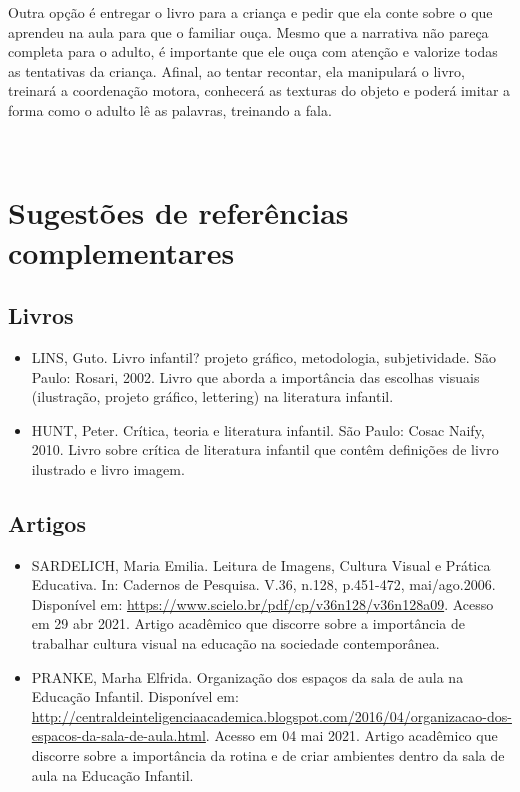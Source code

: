 \documentclass[11pt]{extarticle}
\begin{document}
\begin{enumerate}
Outra opção é entregar o livro para a criança e pedir que ela conte 
sobre o que aprendeu na aula para que o familiar ouça. Mesmo que a narrativa não pareça 
completa para o adulto, é importante que ele ouça com atenção e 
valorize todas as tentativas da criança. Afinal, ao tentar recontar, 
ela manipulará o livro, treinará a coordenação motora, conhecerá as texturas 
do objeto e poderá imitar a forma como o adulto 
lê as palavras, treinando a fala. 
\end{enumerate}

 
\section{Sugestões de referências complementares}

\subsection{Livros} 

\begin{itemize}
\item LINS, Guto. Livro infantil? projeto gráfico, metodologia, subjetividade. São Paulo: Rosari, 2002.
Livro que aborda a importância das escolhas visuais (ilustração, projeto gráfico, lettering) na literatura infantil.  

\item HUNT, Peter. Crítica, teoria e literatura infantil. São Paulo: Cosac Naify, 2010.
Livro sobre crítica de literatura infantil que contêm definições de livro ilustrado e livro imagem. 
\end{itemize}

\subsection{Artigos}

\begin{itemize}
\item SARDELICH, Maria Emilia. Leitura de Imagens, Cultura Visual e Prática Educativa. 
In: Cadernos de Pesquisa. V.36, n.128, p.451-472, mai/ago.2006. Disponível em: \url{https://www.scielo.br/pdf/cp/v36n128/v36n128a09}. 
Acesso em 29 abr 2021. 
Artigo acadêmico que discorre sobre a importância de trabalhar cultura 
visual na educação na sociedade contemporânea. 

\item PRANKE, Marha Elfrida. Organização dos espaços da sala de aula na Educação Infantil. Disponível em: \url{http://centraldeinteligenciaacademica.blogspot.com/2016/04/organizacao-dos-espacos-da-sala-de-aula.html}. Acesso em 04 mai 2021. 
Artigo acadêmico que discorre sobre a importância da rotina e de criar ambientes dentro da sala de aula na Educação Infantil.  
\end{itemize}
\end{document}
